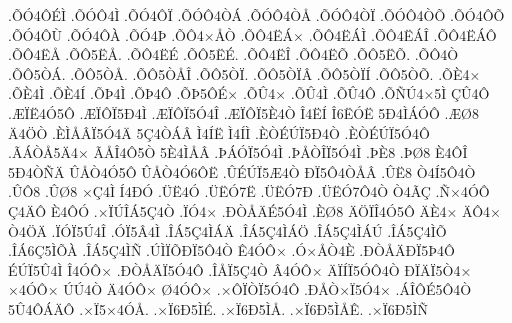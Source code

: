 {.^^d5^^d34^^d4^^c9^^cc
.^^d5^^d3^^d44^^cc
.^^d5^^d34^^d4^^cf
.^^d5^^d3^^d44^^d2^^c1
.^^d5^^d3^^d44^^d2^^c5
.^^d5^^d3^^d44^^d2^^cf
.^^d5^^d3^^d44^^d2^^d5
.^^d5^^d34^^d4^^d5
.^^d5^^d34^^d4^^d9
.^^d5^^d34^^d4^^c0
.^^d5^^d34^^de
.^^d5^^d44^^d7^^c5^^d2
.^^d5^^d44^^cb^^c1^^d7
.^^d5^^d44^^cb^^c1^^cc
.^^d5^^d44^^cb^^c1^^ce
.^^d5^^d44^^cb^^c1^^d4
.^^d5^^d44^^cb^^c5
.^^d5^^d45^^cb^^c5.
.^^d5^^d44^^cb^^c9
.^^d5^^d45^^cb^^c9.
.^^d5^^d44^^cb^^ce
.^^d5^^d44^^cb^^d5
.^^d5^^d45^^cb^^d5.
.^^d5^^d44^^d2
.^^d5^^d45^^d2^^c1.
.^^d5^^d45^^d2^^c5.
.^^d5^^d45^^d2^^c5^^ce
.^^d5^^d45^^d2^^cf.
.^^d5^^d45^^d2^^cf^^c2
.^^d5^^d45^^d2^^cf^^cd
.^^d5^^d45^^d2^^d5.
.^^d5^^c84^^d7
.^^d5^^c84^^cc
.^^d5^^c84^^cd
.^^d5^^de4^^cc
.^^d5^^de4^^d4
.^^d5^^de5^^d4^^c9^^d7
.^^d5^^db4^^d7
.^^d5^^db4^^cc
.^^d5^^db4^^d4
.^^d5^^d1^^da4^^d75^^cc
^^c7^^db4^^d4
.^^c6^^cf^^cb4^^d35^^d4
.^^c6^^cf^^d4^^cf5^^d04^^cc
.^^c6^^cf^^d4^^cf5^^d34^^ce
.^^c6^^cf^^d4^^cf5^^c84^^d2
^^ce4^^cb^^cd
^^ce6^^cb^^d3^^cb
5^^d04^^cc^^c1^^d3^^d4
.^^c6^^d88
^^c44^^d6^^d2
.^^c8^^cc^^c5^^c2^^cf5^^d34^^c4
5^^c74^^d2^^c1^^c2
^^cc4^^cd^^cb
^^cc4^^cd^^cc
.^^c8^^d2^^c9^^da^^cf5^^d04^^d2
.^^c8^^d2^^c9^^da^^cf5^^d34^^d4
.^^c3^^c1^^d2^^c55^^c44^^d7
^^c3^^c5^^ce4^^d45^^d2
5^^c84^^cc^^c5^^c2
.^^de^^c1^^d3^^cf5^^d34^^cc
.^^de^^c5^^d2^^ce^^cf5^^d34^^cc
.^^de^^c88
.^^de^^d88
^^c84^^d4^^ce
5^^d04^^d2^^d1^^c4
^^db^^c5^^d24^^d35^^d4
^^db^^c5^^d24^^d36^^d4^^cb
.^^db^^c9^^da^^cf5^^c64^^d2
^^d0^^cf5^^d44^^d2^^c5^^c2
.^^db^^cb8
^^d24^^cd5^^d44^^d2
.^^db^^d48
.^^db^^d88
^^d7^^c74^^cc
^^cd4^^d0^^d3
.^^dc^^cb4^^d3
.^^dc^^cb^^d37^^cb
.^^dc^^cb^^d37^^d0
.^^dc^^cb^^d37^^d44^^d2
^^d24^^c3^^c7
.^^d1^^d74^^d3^^d4
^^c74^^c4^^d4
^^c84^^d4^^d3
.^^d7^^cf^^da^^ce^^c15^^c74^^d2
.^^cf^^d34^^d7
.^^d0^^d2^^c5^^c4^^c95^^d34^^cc
.^^c8^^d88
^^c4^^d6^^cf^^ce4^^d35^^d4
^^c4^^c84^^d7
^^c4^^d44^^d7
^^d24^^d6^^c4
.^^cf^^d3^^cf5^^da4^^ce
.^^d3^^cf5^^c24^^cc
.^^ce^^c15^^c74^^cc^^c1^^c4
.^^ce^^c15^^c74^^cc^^c1^^d6
.^^ce^^c15^^c74^^cc^^c1^^da
.^^ce^^c15^^c74^^cc^^d5
.^^ce^^c16^^c75^^cc^^d5^^c0
.^^ce^^c15^^c74^^cc^^d1
.^^da^^cc^^cf^^d5^^d0^^cf5^^d44^^d2
^^ca4^^d3^^d4^^d7
.^^d3^^d7^^c5^^d24^^c8
.^^d0^^d2^^c5^^c4^^d0^^cf5^^de4^^d4
^^c9^^da^^cf5^^db4^^cc
^^ce4^^d3^^d4^^d7
.^^d0^^d2^^c5^^c4^^cf5^^d34^^d4
.^^ce^^c5^^cf5^^c74^^d2
^^c24^^d3^^d4^^d7
^^c4^^cf^^cd^^cf5^^d3^^d44^^d2
^^d0^^cf^^c4^^cf5^^d24^^d7
^^d74^^d3^^d4^^d7
^^da^^da4^^d2
^^c44^^d3^^d4^^d7
^^d84^^d3^^d4^^d7
.^^d7^^d4^^cf^^d2^^cf5^^d34^^d4
.^^d0^^c5^^d2^^d7^^cf5^^d34^^d7
.^^c1^^ce^^d4^^c95^^d44^^d2
5^^db4^^d4^^c1^^c4^^d4
.^^d7^^cf5^^d74^^d3^^c5.
.^^d7^^cf6^^d05^^cc^^c9.
.^^d7^^cf6^^d05^^cc^^c5.
.^^d7^^cf6^^d05^^cc^^c5^^ca.
.^^d7^^cf6^^d05^^cc^^d1
}
